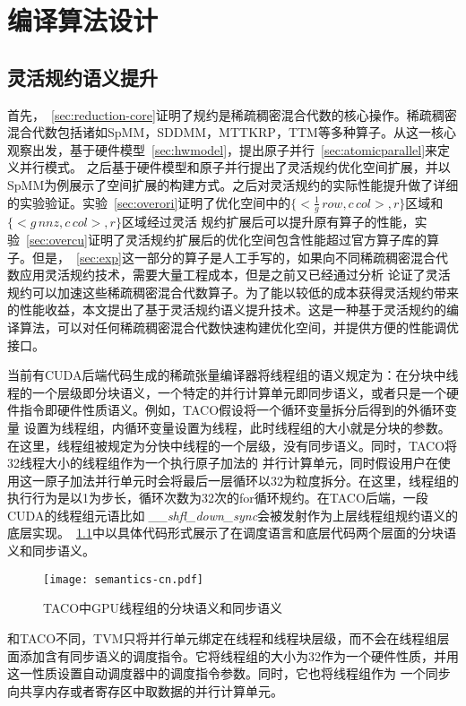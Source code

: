 
\chapter{编译算法设计}

\section{灵活规约语义提升}\label{sec:compiler-alg-intro}
首先，~\ref{sec:reduction-core}证明了规约是稀疏稠密混合代数的核心操作。稀疏稠密混合代数包括诸如SpMM，SDDMM，MTTKRP，TTM等多种算子。从这一核心观察出发，基于硬件模型~\ref{sec:hwmodel}，提出原子并行~\ref{sec:atomicparallel}来定义并行模式。
之后基于硬件模型和原子并行提出了灵活规约优化空间扩展，并以SpMM为例展示了空间扩展的构建方式。之后对灵活规约的实际性能提升做了详细的实验验证。实验~\ref{sec:overori}证明了优化空间中的$\{<\frac{1}{g}\,row , c\,col>,r\}$区域和$\{<g\,nnz , c\,col>,r\}$区域经过灵活
规约扩展后可以提升原有算子的性能，实验~\ref{sec:overcu}证明了灵活规约扩展后的优化空间包含性能超过官方算子库的算子。但是，~\ref{sec:exp}这一部分的算子是人工手写的，如果向不同稀疏稠密混合代数应用灵活规约技术，需要大量工程成本，但是之前又已经通过分析
论证了灵活规约可以加速这些稀疏稠密混合代数算子。为了能以较低的成本获得灵活规约带来的性能收益，本文提出了基于灵活规约语义提升技术。这是一种基于灵活规约的编译算法，可以对任何稀疏稠密混合代数快速构建优化空间，并提供方便的性能调优接口。

当前有CUDA后端代码生成的稀疏张量编译器将线程组的语义规定为：在分块中线程的一个层级即分块语义，一个特定的并行计算单元即同步语义，或者只是一个硬件指令即硬件性质语义。例如，TACO假设将一个循环变量拆分后得到的外循环变量
设置为线程组，内循环变量设置为线程，此时线程组的大小就是分块的参数。在这里，线程组被规定为分快中线程的一个层级，没有同步语义。同时，TACO将32线程大小的线程组作为一个执行原子加法的
并行计算单元，同时假设用户在使用这一原子加法并行单元时会将最后一层循环以32为粒度拆分。在这里，线程组的执行行为是以1为步长，循环次数为32次的for循环规约。在TACO后端，一段CUDA的线程组元语比如
\textit{\_\_shfl\_down\_sync}会被发射作为上层线程组规约语义的底层实现。~\ref{fig:sem}中以具体代码形式展示了在调度语言和底层代码两个层面的分块语义和同步语义。
\begin{figure}[h]%
  \centering
  \texttt{[image: semantics-cn.pdf]}
  \caption{TACO中GPU线程组的分块语义和同步语义}
  \label{fig:sem}
\end{figure}
和TACO不同，TVM只将并行单元绑定在线程和线程块层级，而不会在线程组层面添加含有同步语义的调度指令。它将线程组的大小为32作为一个硬件性质，并用这一性质设置自动调度器中的调度指令参数。同时，它也将线程组作为
一个同步向共享内存或者寄存区中取数据的并行计算单元。

